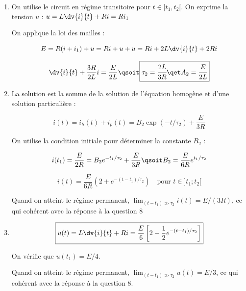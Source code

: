 \documentclass[a4paper, 10pt, garamond, oneside]{book}
\begin{document}
{\begin{enumerate}[resume]
\begin{minipage}[t]{.49\linewidth}
			      \[
				      u(t_2^-)=\frac{R/2}{R+R/2}E\qsoit
				      \boxed{u(t_2^-)=\frac{E}{3}}
			      \]

		      \end{minipage}
		      \hfill
		      \begin{minipage}[t]{.49\linewidth}
			      ~
			      \begin{center}
				      {transRL_corr2.pdf_tex}
			      \end{center}
		      \end{minipage}
		      En appliquant la loi d'Ohm, on trouve le courant $i$  : $\boxed{i(t_2^-)=\cfrac{E}{3R}}$
		\item
		      On utilise le circuit en régime transitoire pour $t\in]t_1,t_2[$. On exprime la tension $u$ : $u=L\dv{i}{t}+Ri=Ri_1$

		      On applique la loi des mailles :

		      \[
			      E=R(i+i_1)+u=Ri+u+u=Ri+2L\dv{i}{t}+2Ri
		      \]

		      \[
			      \dv{i}{t}+\frac{3R}{2L}i=\frac{E}{2L}
			      \qsoit\boxed{\tau_2=\cfrac{2L}{3R}\qet A_2=\cfrac{E}{2L}}
		      \]
		\item
		      La solution est la somme de la solution de l'équation homogène et d'une solution particulière :

		      \[
			      i(t)=i_h(t)+i_p(t)=B_2\exp(-t/\tau_2)+\frac{E}{3R}
		      \]



		      On utilise la condition initiale  pour déterminer la constante $B_2$ :

		      \[
			      i(t_1)=\frac{E}{2R}=B_2e^{-t_1/\tau_2}+\frac{E}{3R}
			      \qsoit B_2=\frac{E}{6R}e^{t_1/\tau_2}
		      \]


		      \[
			      \boxed{i(t)= \frac{E}{6R}\left (2+e^{-(t-t_1)/\tau_2}  \right )\quad\mbox{pour } t\in]t_1;t_2[}
		      \]

		      Quand on atteint le régime permanent, $\lim_{(t-t_1)\gg \tau_2}i(t)= E/(3R)$, ce qui cohérent avec la réponse à la question 8

		\item

		      \[
			      \boxed{u(t)=L\dv{i}{t}+Ri=\frac{E}{6}\left [2-\frac{1}{2}e^{-(t-t_1)/\tau_2}  \right ]}
		      \]

		      On vérifie que $u(t_1)=E/4$.

		      Quand on atteint le régime permanent, $\lim_{(t-t_1)\gg \tau_2}u(t)= E/3$, ce qui cohérent avec la réponse à la question 8.
	\end{enumerate}
}
\end{document}

